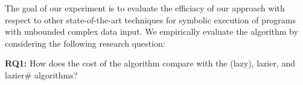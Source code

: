 
\begin{comment}
Loops and recursive methods over symbolic variables are bounded based
on some user-provided limit. These bounds are based on some
control-flow structure of the program and are often insufficient for
analyzing programs with input of complex data types as demonstrated
in~\cite{Kiasan07,Deng:2006}. In this work we use the $k$-bounding
technique that bounds the length of a reference chain from the root of
the heap~\cite{Deng:2006}.\nsr{check this!} Note we use $k$-bounding
because it preserves the functional equivalence of \gsetxt{}, lazier,
lazier\# and \symtxt{} techniques, a fact which can be established by
induction over the length of reference chains from a given initial
state. The $n$-bounding approach restricts the total number of
references created along a certain path. There is no easy way to
compare the number of references generated by \symtxt{} and other
techniques since \symtxt{} can create many references at a single
access point in its heap summary.
\end{comment}

The goal of our experiment is to evaluate the efficiacy of our approach
with respect to other state-of-the-art techniques for symbolic
execution of programs with unbounded complex data input. We empirically
evaluate the \symtxt{} algorithm by considering the following research question:

\begin{description}
\item {\bf RQ1:} How does the cost of the \symtxt{} algorithm compare with
the \gsetxt{} (lazy), lazier, and lazier\# algorithms?

\end{description}

